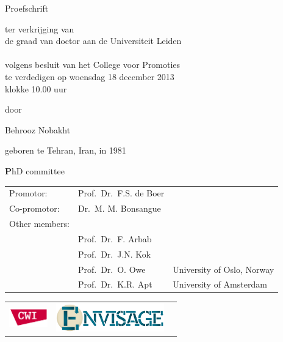 {%
\clearpage
\par\vskip 2cm
\begin{center}
\printtitle
\par\vspace {2.1cm}
{\large \textsc Proefschrift}
\par\vspace {1.5cm}
{\large ter verkrijging van\\[.5cm]
de graad van doctor aan de Universiteit Leiden\\[.5cm]
\\[.5cm]
volgens besluit van het College voor Promoties\\[.5cm]
te verdedigen %
op woensdag 18 december 2013\\[.5cm]
klokke 10.00 uur \\[.5cm] }
\par\vspace {1cm} {\large door}
\par \vspace {.5cm} %
{\Large Behrooz Nobakht}    
\par%
{\large geboren te Tehran, Iran, in 1981} %
\end{center}
\clearpage
\noindent%
{\textbf PhD committee}\\[.5cm]

\begin{tabular}{lll}
Promotor:    & Prof.\ Dr.\ F.S. de Boer & \\
Co-promotor: & Dr.\ M. M. Bonsangue & \\[12pt]
Other members:\\
& Prof.\ Dr.\ F. Arbab & \\
& Prof.\ Dr.\ J.N. Kok & \\
& Prof.\ Dr.\ O. Owe & University of Oslo, Norway\\
& Prof.\ Dr.\ K.R. Apt & University of Amsterdam\\
\end{tabular}

\vfill
\vspace{5.5cm}

\hspace{-0.5cm}
\begin{tabular}{lll}
\includegraphics[height=0.8cm]{figs/cwi.png} &
\includegraphics[height=1.2cm]{figs/envisage-logo} &
\end{tabular}
\\ \\

}
